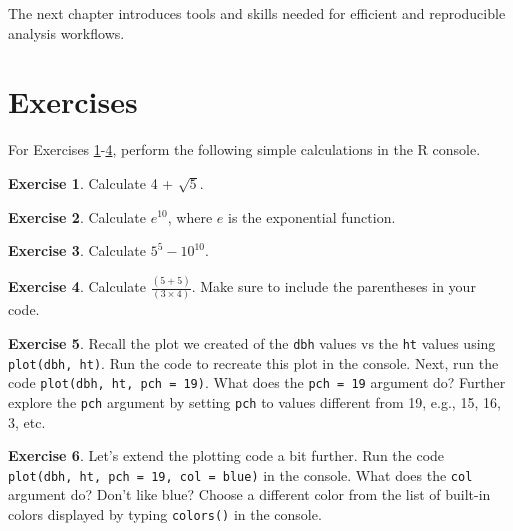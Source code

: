 \documentclass[
  11pt,
]{krantz}
\theoremstyle{definition}
\theoremstyle{definition}
\theoremstyle{definition}
\newtheorem{exercise}{Exercise}[chapter]
\theoremstyle{definition}
\theoremstyle{remark}
\begin{document}
The next chapter introduces tools and skills needed for efficient and reproducible analysis workflows.

\hypertarget{exercisesIntroR}{%
\section{Exercises}\label{exercisesIntroR}}

For Exercises \ref{exr:intro1}-\ref{exr:intro4}, perform the following simple calculations in the R console.

\begin{exercise}
\protect\hypertarget{exr:intro1}{}\label{exr:intro1}Calculate 4 + \(\sqrt{5}\).
\end{exercise}

\begin{exercise}
\protect\hypertarget{exr:intro2}{}\label{exr:intro2}Calculate \(e^{10}\), where \(e\) is the exponential function.
\end{exercise}

\begin{exercise}
\protect\hypertarget{exr:intro3}{}\label{exr:intro3}Calculate \(5^5 - 10^{10}\).
\end{exercise}

\begin{exercise}
\protect\hypertarget{exr:intro4}{}\label{exr:intro4}Calculate \(\frac{(5 + 5)}{(3 \times 4)}\). Make sure to include the parentheses in your code.
\end{exercise}

\begin{exercise}
\protect\hypertarget{exr:intro5}{}\label{exr:intro5}Recall the plot we created of the \texttt{dbh} values vs the \texttt{ht} values using \texttt{plot(dbh,\ ht)}. Run the code to recreate this plot in the console. Next, run the code \texttt{plot(dbh,\ ht,\ pch\ =\ 19)}. What does the \texttt{pch\ =\ 19} argument do? Further explore the \texttt{pch} argument by setting \texttt{pch} to values different from 19, e.g., 15, 16, 3, etc.
\end{exercise}

\begin{exercise}
\protect\hypertarget{exr:intro6}{}\label{exr:intro6}Let's extend the plotting code a bit further. Run the code \texttt{plot(dbh,\ ht,\ pch\ =\ 19,\ col\ =\ \textquotesingle{}blue\textquotesingle{})} in the console. What does the \texttt{col} argument do? Don't like blue? Choose a different color from the list of built-in colors displayed by typing \texttt{colors()} in the console.
\end{exercise}
\end{document}
